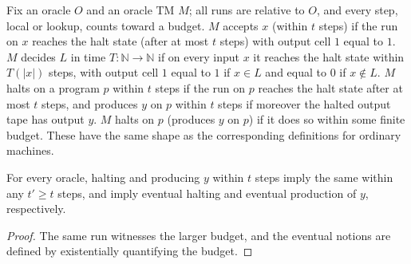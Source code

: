 \begin{definition}
  \label{def:barriers-oracle-decides}
  \leanok
  Fix an oracle $O$ and an oracle TM $M$; all runs are relative to $O$, and
  every step, local or lookup, counts toward a budget. $M$ accepts $x$ (within
  $t$ steps) if the run on $x$ reaches the halt state (after at most $t$
  steps) with output cell $1$ equal to $1$. $M$ decides $L$ in time
  $T : \mathbb{N} \to \mathbb{N}$ if on every input $x$ it reaches the halt
  state within $T(|x|)$ steps, with output cell $1$ equal to $1$ if $x \in L$
  and equal to $0$ if $x \notin L$. $M$ halts on a program $p$ within $t$
  steps if the run on $p$ reaches the halt state after at most $t$ steps, and
  produces $y$ on $p$ within $t$ steps if moreover the halted output tape has
  output $y$. $M$ halts on $p$ (produces $y$ on $p$) if it does so within some
  finite budget. These have the same shape as the corresponding definitions for
  ordinary machines.
\end{definition}

\begin{lemma}
  \label{lem:barriers-oracle-clock-mono}
  \leanok
  For every oracle, halting and producing $y$ within $t$ steps imply the same
  within any $t' \ge t$ steps, and imply eventual halting and eventual
  production of $y$, respectively.
\end{lemma}
\begin{proof}
  \leanok
  The same run witnesses the larger budget, and the eventual notions are
  defined by existentially quantifying the budget.
\end{proof}

